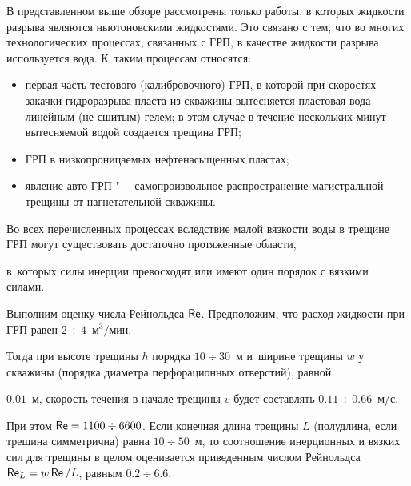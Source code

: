 \smallskip



\label{sec:fiz_osn}

В представленном выше обзоре рассмотрены только работы, в которых жидкости разрыва являются ньютоновскими жидкостями. Это связано с тем, что во многих технологических процессах, связанных с ГРП, в качестве жидкости разрыва используется вода. К~таким процессам относятся: \hypertarget{bulg:proc}{}

\begin{itemize}

\item[1)] первая часть тестового (калибровочного) ГРП, в которой при скоростях закачки гидроразрыва пласта из скважины вытесняется пластовая вода линейным (не сшитым) гелем; в этом случае в течение нескольких минут вытесняемой водой создается трещина ГРП; 

\item[2)] ГРП в низкопроницаемых нефтенасыщенных пластах; 

\item[3)] явление авто-ГРП "--- самопроизвольное распространение магистральной трещины от нагнетательной скважины.





\end{itemize}



Во всех перечисленных процессах вследствие малой вязкости воды в трещине ГРП могут существовать достаточно протяженные области, 

в~которых силы инерции превосходят или имеют один порядок с вязкими силами. 

Выполним оценку числа Рейнольдса $\sf Re$.  Предположим, что расход жидкости при ГРП равен $2 \div 4$~м$^3/$мин. 

Тогда при высоте трещины $h$ порядка $10 \div 30$~м  и~ширине трещины $w$ у скважины (порядка диаметра перфорационных отверстий), равной 

$0.01$~м, скорость течения в начале трещины $v$ будет составлять $0.11 \div 0.66$~м/с. 

При этом ${\sf Re} =1100 \div 6600$. Если конечная длина трещины $L$ (полудлина, если трещина симметрична)  равна $10 \div 50$~м, то соотношение инерционных и вязких сил для трещины в целом оценивается приведенным числом Рейнольдса ${\sf Re}_L = w \mathop{\sf Re}  / L$, равным $0.2 \div 6.6$. 


